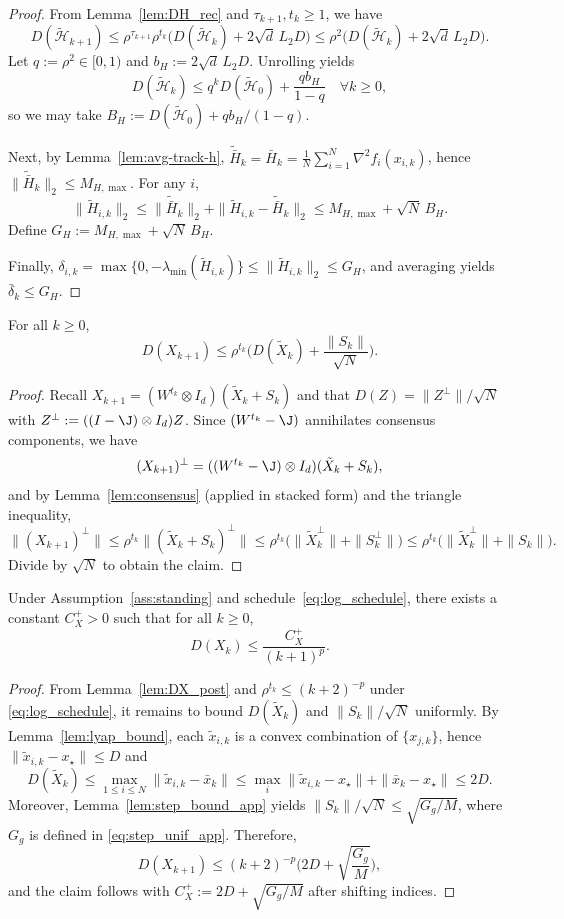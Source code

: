 \documentclass[review,onefignum,onetabnum]{siamart171218}
\begin{document}
\begin{proof}
From Lemma~\ref{lem:DH_rec} and $\tau_{k+1},t_k\ge 1$, we have
\[
D(\tilde{\mathcal H}_{k+1})
\le \rho^{\tau_{k+1}}\rho^{t_k}\Big(D(\tilde{\mathcal H}_k)+2\sqrt d\,L_2D\Big)
\le \rho^2\Big(D(\tilde{\mathcal H}_k)+2\sqrt d\,L_2D\Big).
\]
Let $q:=\rho^2\in[0,1)$ and $b_H:=2\sqrt d\,L_2D$. Unrolling yields
\[
D(\tilde{\mathcal H}_k)\le q^k D(\tilde{\mathcal H}_0)+\frac{qb_H}{1-q}\quad \forall k\ge 0,
\]
so we may take $B_H:=D(\tilde{\mathcal H}_0)+qb_H/(1-q)$.

Next, by Lemma~\ref{lem:avg-track-h},
$\tilde{\bar H}_k=\bar H_k=\frac1N\sum_{i=1}^N\nabla^2 f_i(x_{i,k})$,
hence $\|\tilde{\bar H}_k\|_2\le M_{H,\max}$.
For any $i$,
\[
\|\tilde H_{i,k}\|_2
\le \|\tilde{\bar H}_k\|_2
+ \|\tilde H_{i,k}\!-\!\tilde{\bar H}_k\|_2
\le M_{H,\max}\!+\!\sqrt{N}\,B_H.
\]
Define $G_H:=M_{H,\max} + \sqrt{N}\,B_H$.

Finally, $\delta_{i,k}=\max\{0,-\lambda_{\min}(\tilde H_{i,k})\}
\le \|\tilde H_{i,k}\|_2\le G_H$,
and averaging yields $\bar\delta_k\le G_H$.
\end{proof}

\begin{lemma}\label{lem:DX_post}
For all $k\ge 0$,
\[
D(X_{k+1})\le \rho^{t_k}\Big(D(\tilde X_k)+\frac{\|S_k\|}{\sqrt N}\Big).
\]
\end{lemma}
\begin{proof}
Recall $X_{k+1}=(W^{t_k}\otimes I_d)(\tilde X_k+S_k)$ and that $D(Z)=\|Z^\perp\|/\sqrt N$ with $Z^\perp:=((I-\J)\otimes I_d)Z$.
Since $(W^{t_k}-\J)$ annihilates consensus components, we have
\[
(X_{k+1})^\perp = ((W^{t_k}-\J)\otimes I_d)(\tilde X_k+S_k),
\]
and by Lemma~\ref{lem:consensus} (applied in stacked form) and the triangle inequality,
\[
\| (X_{k+1})^\perp\|
\le \rho^{t_k}\|(\tilde X_k+S_k)^\perp\|
\le \rho^{t_k}\big(\|\tilde X_k^\perp\|+\|S_k^\perp\|\big)
\le \rho^{t_k}\big(\|\tilde X_k^\perp\|+\|S_k\|\big).
\]
Divide by $\sqrt N$ to obtain the claim.
\end{proof}

\begin{lemma}\label{lem:DX_post_decay}
Under Assumption~\ref{ass:standing} and schedule~\eqref{eq:log_schedule}, there exists a constant $C_X^{+}>0$ such that for all $k\ge 0$,
\[
D(X_k)\le \frac{C_X^{+}}{(k+1)^{p}}.
\]
\end{lemma}
\begin{proof}
From Lemma~\ref{lem:DX_post} and $\rho^{t_k}\le (k+2)^{-p}$ under \eqref{eq:log_schedule}, it remains to bound
$D(\tilde X_k)$ and $\|S_k\|/\sqrt N$ uniformly.
By Lemma~\ref{lem:lyap_bound}, each $\tilde x_{i,k}$ is a convex combination of $\{x_{j,k}\}$, hence $\|\tilde x_{i,k}-x_\star\|\le D$ and
\[
D(\tilde X_k)\le \max_{1\le i\le N}\|\tilde x_{i,k}-\bar x_k\|
\le \max_i \|\tilde x_{i,k}-x_\star\|+\|\bar x_k-x_\star\|\le 2D.
\]
Moreover, Lemma~\ref{lem:step_bound_app} yields $\|S_k\|/\sqrt N\le \sqrt{G_g/M}$, where $G_g$ is defined in \eqref{eq:step_unif_app}.
Therefore,
\[
D(X_{k+1})\le (k+2)^{-p}\Big(2D+\sqrt{\frac{G_g}{M}}\Big),
\]
and the claim follows with $C_X^{+}:=2D+\sqrt{G_g/M}$ after shifting indices.
\end{proof}
\end{document}
